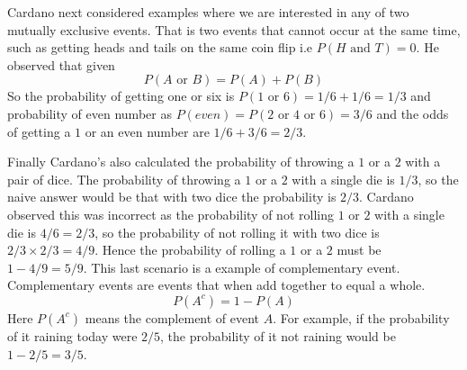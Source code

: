 \myindent Cardano next considered examples where we are interested in any of two  mutually exclusive events. That is two events that cannot occur at the same time, such as getting heads and tails on the same coin flip i.e $P(H \text{ and } T) = 0$. He observed that given
\begin{equation}\label{prob:exclusive-event}
P(A \text{ or } B) = P(A) + P(B)
\end{equation}
So the probability of getting one or six is $P(1 \text{ or } 6) = 1/6 + 1/6 = 1/3$ and probability of even number as $P(even) = P(2 \text{ or } 4 \text{ or } 6) = 3/6$ and the odds of getting a $1$ or an even number are $1/6 + 3/6 = 2/3$. 

\myindent Finally Cardano’s also calculated the probability of throwing a $1$ or a $2$ with a pair of dice. The probability of throwing a $1$ or a $2$ with a single die is $1/3$, so the naive answer would be that with two dice the probability is $2/3$. Cardano observed this was incorrect as the probability of not rolling $1$ or $2$ with a single die is $4/6 = 2/3$, so the probability of not rolling it with two dice is $2/3 \times 2/3 = 4/9$. Hence the probability of rolling a $1$ or a $2$ must be $1 - 4/9 = 5/9$. This last scenario is a example of complementary event. Complementary events are events that when add together to equal a whole. 
\begin{equation}\label{prob:complementary-event}
P(A^c) = 1 - P(A)
\end{equation}
Here $P(A^c)$ means the complement of event $A$. For example, if the probability of it raining today were $2/5$, the probability of it not raining would be $1 - 2/5 = 3/5$. 

